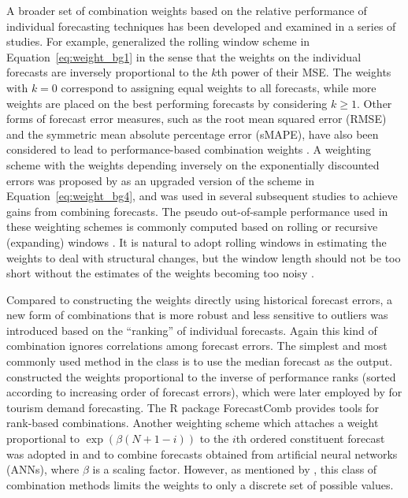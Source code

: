 \documentclass[a4paper,11pt]{article}
\newcommand{\pkg}[1]{{\normalfont\fontseries{b}\selectfont #1}}
\let\proglang=\textsf
\begin{document}
A broader set of combination weights based on the relative performance of individual forecasting techniques has been developed and examined in a series of studies. For example, \citet{Stock1998-np} generalized the rolling window scheme in Equation~\eqref{eq:weight_bg1} in the sense that the weights on the individual forecasts are inversely proportional to the $k$th power of their MSE. The weights with $k = 0$ correspond to assigning equal weights to all forecasts, while more weights are placed on the best performing forecasts by considering $k \geq 1$. Other forms of forecast error measures, such as the root mean squared error (RMSE) and the symmetric mean absolute percentage error (sMAPE), have also been considered to lead to performance-based combination weights \citep[e.g.,][]{Nowotarski2014-ev,Pawlikowski2020-hm}. A weighting scheme with the weights depending inversely on the exponentially discounted errors was proposed by \citet{Stock2004-rq} as an upgraded version of the scheme in Equation~\eqref{eq:weight_bg4}, and was used in several subsequent studies \citep[e.g.,][]{Clark2010-jx,Genre2013-ut} to achieve gains from combining forecasts. The pseudo out-of-sample performance used in these weighting schemes is commonly computed based on rolling or recursive (expanding) windows \citep[e.g.,][]{Stock1998-np,Clark2010-jx,Genre2013-ut}. It is natural to adopt rolling windows in estimating the weights to deal with structural changes, but the window length should not be too short without the estimates of the weights becoming too noisy \citep{Baumeister2015-ft}.

Compared to constructing the weights directly using historical forecast errors, a new form of combinations that is more robust and less sensitive to outliers was introduced based on the ``ranking'' of individual forecasts. Again this kind of combination ignores correlations among forecast errors. The simplest and most commonly used method in the class is to use the median forecast as the output. \citet{Aiolfi2006-rh} constructed the weights proportional to the inverse of performance ranks (sorted according to increasing order of forecast errors), which were later employed by \citet{Andrawis2011-kb} for tourism demand forecasting. The \proglang{R} package \pkg{ForecastComb} \citep{rForecastComb} provides tools for rank-based combinations. Another weighting scheme which attaches a weight proportional to $\exp(\beta(N+1-i))$ to the $i$th ordered constituent forecast was adopted in \citet{Yao2008-or} and \citet{Donate2013-lq} to combine forecasts obtained from artificial neural networks (ANNs), where $\beta$ is a scaling factor. However, as mentioned by \citet{Andrawis2011-kb}, this class of combination methods limits the weights to only a discrete set of possible values.
\end{document}
